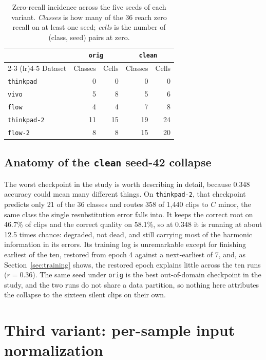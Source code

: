 \documentclass[pdflatex,sn-mathphys-num]{sn-jnl}
\begin{document}
\begin{table}[t]
\caption{Zero-recall incidence across the five seeds of each variant. \emph{Classes} is how many of the 36 reach zero recall on at least one seed; \emph{cells} is the number of (class, seed) pairs at zero.}\label{tab:esm-zero}
\setlength{\tabcolsep}{5pt}
\begin{tabular}{@{}lrrrr@{}}
\toprule
 & \multicolumn{2}{c}{\texttt{orig}} & \multicolumn{2}{c}{\texttt{clean}} \\
\cmidrule(lr){2-3} \cmidrule(lr){4-5}
Dataset & Classes & Cells & Classes & Cells \\
\midrule
\texttt{thinkpad} & 0 & 0 & 0 & 0 \\
\texttt{vivo} & 5 & 8 & 5 & 6 \\
\texttt{flow} & 4 & 4 & 7 & 8 \\
\texttt{thinkpad-2} & 11 & 15 & 19 & 24 \\
\texttt{flow-2} & 8 & 8 & 15 & 20 \\
\bottomrule
\end{tabular}
\end{table}

\subsection{Anatomy of the \texttt{clean} seed-42 collapse}\label{sec:collapse}

The worst checkpoint in the study is worth describing in detail, because 0.348 accuracy could mean many different things. On \texttt{thinkpad-2}, that checkpoint predicts only 21 of the 36 classes and routes 358 of 1{,}440 clips to $C$ minor, the same class the single resubstitution error falls into. It keeps the correct root on 46.7\% of clips and the correct quality on 58.1\%, so at 0.348 it is running at about 12.5 times chance: degraded, not dead, and still carrying most of the harmonic information in its errors. Its training log is unremarkable except for finishing earliest of the ten, restored from epoch 4 against a next-earliest of 7, and, as Section~\ref{sec:training} shows, the restored epoch explains little across the ten runs ($r=0.36$). The same seed under \texttt{orig} is the best out-of-domain checkpoint in the study, and the two runs do not share a data partition, so nothing here attributes the collapse to the sixteen silent clips on their own.

\section{Third variant: per-sample input normalization}\label{sec:insnorm}
\end{document}
